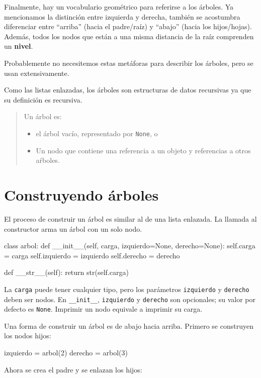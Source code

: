 Finalmente, hay un vocabulario geométrico para referirse a los árboles.
Ya mencionamos la distinción entre izquierda y derecha, también se
acostumbra diferenciar entre ``arriba'' (hacia el padre/raíz) y
``abajo'' (hacia los hijos/hojas). Además, todos los nodos que están
a una misma distancia de la raíz comprenden un \textbf{nivel}.

Probablemente no necesitemos estas metáforas para describir los árboles,
pero se usan extensivamente.

Como las listas enlazadas, los árboles son estructuras de datos recursivas
ya que su definición es recursiva.

 
\begin{quote}
Un árbol es:

\begin{itemize}
\item el árbol vacío, representado por \texttt{None}, o
\item Un nodo que contiene una referencia a un objeto y referencias a otros
aŕboles.
\end{itemize}
\end{quote}

\section{Construyendo árboles}

El proceso de construir un árbol es similar al de una lista enlazada.
La llamada al constructor arma un árbol con un solo nodo.

\beforeverb 
\begin{pythoncode}
class arbol:
  def __init__(self, carga, izquierdo=None, derecho=None):
    self.carga = carga
    self.izquierdo  = izquierdo
    self.derecho = derecho

  def __str__(self):
    return str(self.carga)
\end{pythoncode}
\afterverb La \texttt{carga} puede tener cualquier tipo, pero los
parámetros \texttt{izquierdo} y \texttt{derecho} deben ser nodos.
En \texttt{\_\_init\_\_}, \texttt{izquierdo} y \texttt{derecho} son
opcionales; su valor por defecto es \texttt{None}. Imprimir un nodo
equivale a imprimir su carga.

Una forma de construir un árbol es de abajo hacia arriba. Primero
se construyen los nodos hijos:

\beforeverb 
\begin{pythoncode}
izquierdo = arbol(2)
derecho = arbol(3)
\end{pythoncode}
\afterverb Ahora se crea el padre y se enlazan los hijos:


